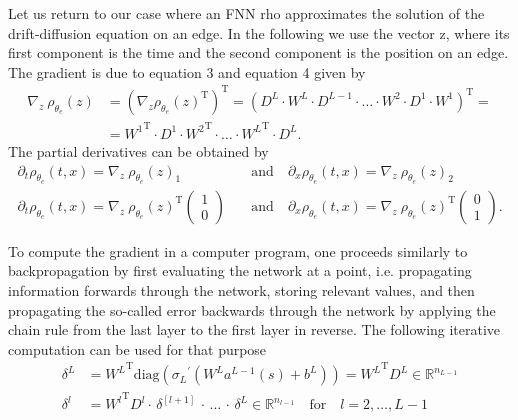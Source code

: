 Let us return to our case where an FNN rho approximates the solution of the drift-diffusion equation on an edge. In the following we use the vector z, where its first component is the time and the second component is the position on an edge. The gradient is due to equation 3 and equation 4 given by 
\begin{equation}
    \begin{split}
        \nabla_{z}  \ \rho_{\theta_e}\left(z\right) & = \left(\nabla_{z} \rho_{\theta_e}\left(z\right)^{\mathrm{T}} \right)^{\mathrm{T}} = \left(D^L \cdot W^L \cdot D^{L-1} \cdot \ldots \cdot W^2 \cdot D^1 \cdot W^{1} \right)^{\mathrm{T}} = \\
        & = {W^{1}}^{\mathrm{T}} \cdot D^{1} \cdot {W^{2}}^{\mathrm{T}} \cdot \ldots \cdot {W^{L}}^{\mathrm{T}}  \cdot  D^{L}. 
    \end{split}
\end{equation}
The partial derivatives can be obtained by 
\begin{equation*}
    \begin{split}
        \partial_t \rho_{\theta_e}\left(t,x\right) = \nabla_{z} \ \rho_{\theta_e}\left(z\right)_1 \quad & \text{and} \quad \partial_x \rho_{\theta_e}\left(t,x\right) = \nabla_{z} \ \rho_{\theta_e}\left(z\right)_2 \\
        \partial_t \rho_{\theta_e}\left(t,x\right) = {\nabla_{z} \ \rho_{\theta_e}\left(z\right)}^{\mathrm{T}} \begin{pmatrix} 1 \\ 0 \end{pmatrix} \quad & \text{and} \quad \partial_x \rho_{\theta_e}\left(t,x\right) = {\nabla_{z} \ \rho_{\theta_e}\left(z\right)}^{\mathrm{T}} \begin{pmatrix} 0 \\ 1 \end{pmatrix}.
    \end{split}
\end{equation*}


To compute the gradient in a computer program, one proceeds similarly to backpropagation by first evaluating the network at a point, i.e. propagating information forwards through the network, storing relevant values, and then propagating the so-called error backwards through the network by applying the chain rule from the last layer to the first layer in reverse. The following iterative computation can be used for that purpose
\begin{align*}
    \delta^{L} & = {W^{L}}^{\mathrm{T}} \mathrm{diag}\left({\sigma_{L}}^{\prime}\left(W^{L} a^{L-1}\left(s\right) + b^{L}\right)\right) = {W^{L}}^{\mathrm{T}} D^{L} \in \mathbb{R}^{n_{L-1}} \\
    \delta^{l} & = {W^{l}}^{\mathrm{T}} D^{l} \cdot \, \delta^{[l+1]} \, \cdot \, \ldots \,  \cdot \, \delta^{L} \in \mathbb{R}^{n_{l-1}} \quad \text{for} \quad l = 2, \ldots, L-1
\end{align*}


